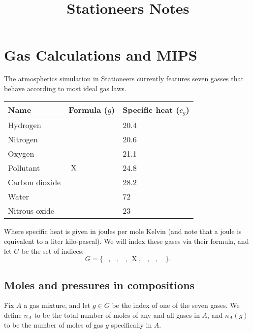\documentclass{article}
\title{Stationeers Notes}
\DeclareMathOperator{\moles}{\mathrm{mol}}
\DeclareMathOperator{\Hyd}{\mathrm{H}_2}
\DeclareMathOperator{\Nit}{\mathrm{N}_2}
\DeclareMathOperator{\Ox}{\mathrm{O}_2}
\DeclareMathOperator{\Pol}{\mathrm{X}}
\DeclareMathOperator{\CDiox}{\mathrm{CO}_2}
\DeclareMathOperator{\Water}{\mathrm{H}_2\mathrm{O}}
\DeclareMathOperator{\NiOx}{\mathrm{N}_2\mathrm{O}}
\begin{document}
\section{Gas Calculations and MIPS}

The atmospherics simulation in Stationeers currently features seven
gasses that behave according to most ideal gas laws.

\begin{center}
    \begin{tabular}{*3l}
        \toprule
        Name & Formula ($g$) & Specific heat ($c_g$) \\
        \midrule
        Hydrogen & $\Hyd$ & 20.4 \\
        Nitrogen & $\Nit$ & 20.6 \\
        Oxygen & $\Ox$ & 21.1 \\
        Pollutant & $\Pol$ & 24.8 \\
        Carbon dioxide & $\CDiox$ & 28.2 \\
        Water & $\Water$ & 72 \\
        Nitrous oxide & $\NiOx$ & 23 \\
        \bottomrule
    \end{tabular}
\end{center}
Where specific heat is given in joules per mole Kelvin
(and note that a joule is equivalent to a liter kilo-pascal).
We will index these gases via their formula, and let $G$ be the set of indices:
\[
    G = \{\
        \Hyd,\
        \Nit,\
        \Ox,\
        \Pol,\
        \CDiox,\
        \Water,\
        \NiOx\
    \}.
\]

\subsection{Moles and pressures in compositions}

Fix $A$ a gas mixture, and let $g\in G$ be the index of one of the seven gases.
We define $n_A$ to be the total number of moles of any and all gases in $A$,
and $n_A(g)$ to be the number of moles of gas $g$ specifically in $A$.

\end{document}
